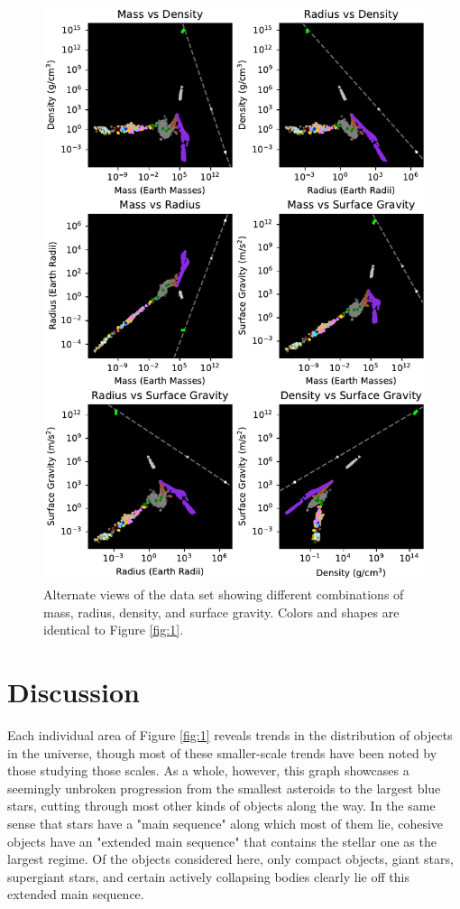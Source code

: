 \documentclass[twocolumn,linenumbers]{aastex631}
\begin{document}
\begin{figure}[htbp]
\centering
\includegraphics[scale = 1]{AltVariableViews.pdf}
\centering
\caption{Alternate views of the data set showing different combinations of mass, radius, density, and surface gravity. Colors and shapes are identical to  Figure \ref{fig:1}.}
\label{fig:3}
\end{figure}

\section{Discussion} \label{sec:intro}

Each individual area of Figure \ref{fig:1} reveals trends in the distribution of objects in the universe, though most of these smaller-scale trends have been noted by those studying those scales. As a whole, however, this graph showcases a seemingly unbroken progression from the smallest asteroids to the largest blue stars, cutting through most other kinds of objects along the way. In the same sense that stars have a "main sequence" along which most of them lie, cohesive objects have an "extended main sequence" that contains the stellar one as the largest regime. Of the objects considered here, only compact objects, giant stars, supergiant stars, and certain actively collapsing bodies clearly lie off this extended main sequence. 
\end{document}

